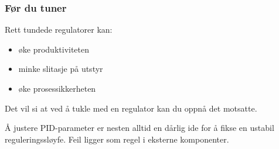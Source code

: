 \documentclass[aspectratio=169,xcolor=dvipsnames]{beamer}
\begin{document}
%
%
%
%
%
%
%
%
%
%
%
%
%
	\begin{frame}
		\frametitle{Før du tuner}
Rett tundede regulatorer kan:
		\begin{itemize}
			\item øke produktiviteten
			\item minke slitasje på utstyr
			\item øke prosessikkerheten
		\end{itemize}

		Det vil si at ved å tukle med en regulator kan du oppnå det motsatte. 
		
		\vskip 10pt 

		Å justere PID-parameter er nesten alltid en dårlig ide for å fikse en ustabil reguleringssløyfe. Feil ligger som regel i eksterne komponenter. 
		
	\end{frame}
\end{document}

